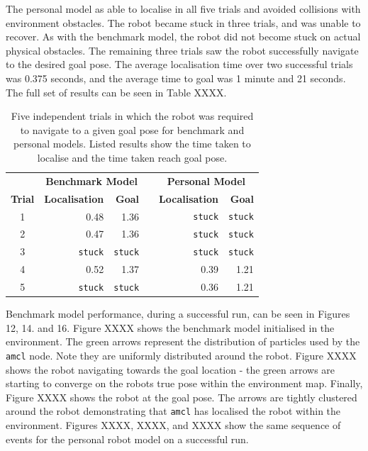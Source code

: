 \documentclass[a4paper]{article}
\begin{document}
\vspace{0.5cm}

The personal model as able to localise in all five trials and avoided collisions with environment obstacles. The robot became stuck in three trials, and was unable to recover. As with the benchmark model, the robot did not become stuck on actual physical obstacles. The remaining three trials saw the robot successfully navigate to the desired goal pose. The average localisation time over two successful trials was 0.375 seconds, and the average time to goal was 1 minute and 21 seconds. The full set of results can be seen in Table XXXX.

\begin{table}[h]
\centering
\caption{Five independent trials in which the robot was required to navigate to a given goal pose for benchmark and personal models. Listed results show the time taken to localise and the time taken reach goal pose.}
\begin{tabular}{crrcrr}
\toprule
& \multicolumn{2}{c}{\textbf{Benchmark Model}} & & \multicolumn{2}{c}{\textbf{Personal Model}} \\
\cline{2-3} \cline{5-6}
\textbf{Trial} & \textbf{Localisation} & \textbf{Goal} & & \textbf{Localisation} & \textbf{Goal} \\
\midrule
1 & 0.48 & 1.36 & & \texttt{stuck} & \texttt{stuck} \\
2 & 0.47 & 1.36 & & \texttt{stuck} & \texttt{stuck} \\
3 & \texttt{stuck} & \texttt{stuck} & & \texttt{stuck} & \texttt{stuck} \\
4 & 0.52 & 1.37 & & 0.39 & 1.21 \\
5 & \texttt{stuck} & \texttt{stuck} & & 0.36 & 1.21 \\
\bottomrule
\end{tabular}
\end{table}

Benchmark model performance, during a successful run, can be seen in Figures 12, 14. and 16. Figure XXXX shows the benchmark model initialised in the environment. The green arrows represent the distribution of particles used by the \texttt{amcl} node. Note they are uniformly distributed around the robot. Figure XXXX shows the robot navigating towards the goal location - the green arrows are starting to converge on the robots true pose within the environment map. Finally, Figure XXXX shows the robot at the goal pose. The arrows are tightly clustered around the robot demonstrating that \texttt{amcl} has localised the robot within the environment. Figures XXXX, XXXX, and XXXX show the same sequence of events for the personal robot model on a successful run.
\end{document}
